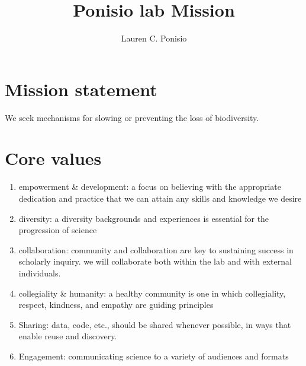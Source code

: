 \documentclass[12pt]{article}
\title{Ponisio lab Mission}
\author{Lauren C. Ponisio}
\begin{document}
\maketitle

\section{Mission statement}
We seek mechanisms for slowing or preventing the loss of biodiversity.

\section{Core values}

\begin{enumerate}
\item empowerment \& development: a focus on believing with the
  appropriate dedication and practice that we can attain any skills
  and knowledge we desire
\item diversity: a diversity backgrounds and experiences is essential
  for the progression of science
\item collaboration: community and collaboration are key to sustaining
  success in scholarly inquiry. we will collaborate both within the
  lab and with external individuals.
\item collegiality \& humanity: a healthy community is one in which
  collegiality, respect, kindness, and empathy are guiding principles
\item Sharing: data, code, etc., should be shared whenever possible,
  in ways that enable reuse and discovery.
\item Engagement: communicating science to a variety of audiences and
  formats
\end{enumerate}
\end{document}
